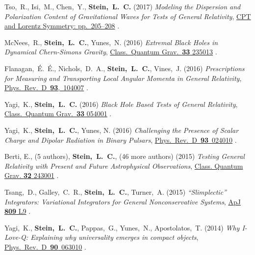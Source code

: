\begin{etaremune}[start=\value{pubCounter}]
\item
  Tso,~R., Isi,~M., Chen,~Y., {\bf Stein,~L.~C.}
  (2017)
  {\it Modeling the Dispersion and Polarization Content of
    Gravitational Waves for Tests of General Relativity},
  \href{http://dx.doi.org/10.1142/9789813148505_0052}{CPT and Lorentz Symmetry: pp.~205--208}
  .
\item
  McNees,~R., {\bf Stein,~L.~C.}, Yunes,~N.
  (2016)
  {\it Extremal Black Holes in Dynamical Chern-Simons Gravity},
  \href{http://dx.doi.org/10.1088/0264-9381/33/23/235013}{Class.~Quantum Grav.~{\bf 33} 235013}
  .
\item
  Flanagan,~\'E.~\'E., Nichols,~D.~A., {\bf Stein,~L.~C.}, Vines,~J.
  (2016)
  {\it Prescriptions for Measuring and Transporting Local Angular
    Momenta in General Relativity},
  \href{http://dx.doi.org/10.1103/PhysRevD.93.104007}{Phys.~Rev.~D~{\bf 93},~104007}
  .
\item
  Yagi,~K., {\bf Stein,~L.~C.}
  (2016)
  {\it Black Hole Based Tests of General Relativity},
  \href{http://dx.doi.org/10.1088/0264-9381/33/5/054001}{Class.~Quantum Grav.~{\bf 33} 054001}
  .
\item
  Yagi,~K., {\bf Stein,~L.~C.}, Yunes, N.
  (2016)
  {\it Challenging the Presence of Scalar Charge and Dipolar Radiation
    in Binary Pulsars},
  \href{http://dx.doi.org/doi:10.1103/PhysRevD.93.024010}{Phys.~Rev.~D~{\bf 93}~024010}
  .
\item
  Berti, E., (5 authors), {\bf Stein,~L.~C.}, (46 more authors)
  (2015)
  {\it Testing General Relativity with Present and Future
    Astrophysical Observations},
  \href{http://dx.doi.org/10.1088/0264-9381/32/24/243001}{Class. Quantum Grav. {\bf 32} 243001}
  .
\item
  Tsang,~D., Galley,~C.~R., {\bf Stein,~L.~C.}, Turner,~A.
  (2015)
  {\it ``Slimplectic'' Integrators: Variational Integrators for General Nonconservative Systems},
  \href{http://dx.doi.org/10.1088/2041-8205/809/1/L9}{ApJ {\bf 809} L9}
  .
\item
  Yagi,~K., {\bf Stein,~L.~C.}, Pappas,~G., Yunes,~N., Apostolatos,~T.
  (2014)
  {\it Why I-Love-Q: Explaining why universality emerges in compact objects},
  \href{http://dx.doi.org/10.1103/PhysRevD.90.063010}{Phys.~Rev.~D~{\bf 90}~063010}
  .

\end{etaremune}
